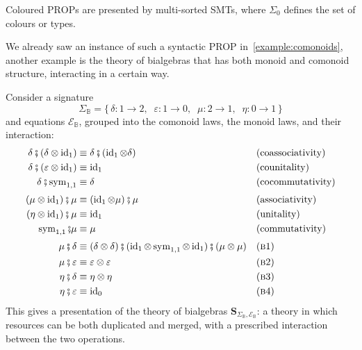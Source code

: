 \begin{remark}
Coloured $\mathrm{PROP}$s are presented by multi-sorted SMTs, where $\Sigma_0$ defines the set of colours or types.
\end{remark}
We already saw an instance of such a syntactic PROP in~\cref{example:comonoids}, another example is the theory of bialgebras that has both monoid and comonoid structure, interacting in a certain way.
\begin{example}
Consider a signature
\[
\Sigma_{\mathbb{B}} = \{\,\delta : 1 \to 2,\;\; \varepsilon : 1 \to 0,\;\;
\mu : 2 \to 1,\;\; \eta : 0 \to 1\,\}
\]
and equations $\mathcal{E}_{\mathbb{B}}$, grouped into the comonoid laws,
the monoid laws, and their interaction:
\begin{align}
  \delta \fatsemi (\delta \otimes \operatorname{id}_1)
    &\equiv \delta \fatsemi (\operatorname{id}_1 \otimes \delta)
    && \text{(coassociativity)} \label{eq:bialg-coassoc}\\
  \delta \fatsemi (\varepsilon \otimes \operatorname{id}_1)
    &\equiv \operatorname{id}_1
    && \text{(counitality)} \label{eq:bialg-counit}\\
  \delta \fatsemi \operatorname{sym}_{1,1}
    &\equiv \delta
    && \text{(cocommutativity)} \label{eq:bialg-cocomm}\\[2pt]
  (\mu \otimes \operatorname{id}_1) \fatsemi \mu
    &\equiv (\operatorname{id}_1 \otimes \mu) \fatsemi \mu
    && \text{(associativity)} \label{eq:bialg-assoc}\\
  (\eta \otimes \operatorname{id}_1) \fatsemi \mu
    &\equiv \operatorname{id}_1
    && \text{(unitality)} \label{eq:bialg-unit}\\
  \operatorname{sym}_{1,1} \fatsemi \mu
    &\equiv \mu
    && \text{(commutativity)} \label{eq:bialg-comm}\\[2pt]
  \mu \fatsemi \delta
    &\equiv (\delta \otimes \delta) \fatsemi
      (\operatorname{id}_1 \otimes \operatorname{sym}_{1,1} \otimes \operatorname{id}_1) \fatsemi (\mu \otimes \mu)
    && \text{(\textsc{b}1)} \label{eq:bialg-b1}\\
  \mu \fatsemi \varepsilon
    &\equiv \varepsilon \otimes \varepsilon
    && \text{(\textsc{b}2)} \label{eq:bialg-b2}\\
  \eta \fatsemi \delta
    &\equiv \eta \otimes \eta
    && \text{(\textsc{b}3)} \label{eq:bialg-b3}\\
  \eta \fatsemi \varepsilon
    &\equiv \operatorname{id}_0
    && \text{(\textsc{b}4)} \label{eq:bialg-b4}
\end{align}
This gives a presentation of the theory of bialgebras
$\mathbf{S}_{\Sigma_{\mathbb{B}}, \mathcal{E}_{\mathbb{B}}}$: a theory in
which resources can be both duplicated and merged, with a prescribed
interaction between the two operations.


\end{example}
